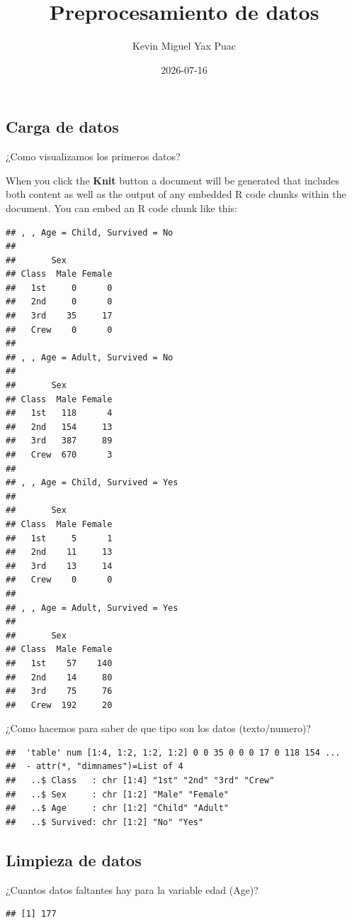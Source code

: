 \documentclass[
]{article}
\title{Preprocesamiento de datos}
\author{Kevin Miguel Yax Puac}
\date{2026-07-16}
\begin{document}
\maketitle

\subsection{Carga de datos}\label{carga-de-datos}

¿Como visualizamos los primeros datos?

When you click the \textbf{Knit} button a document will be generated
that includes both content as well as the output of any embedded R code
chunks within the document. You can embed an R code chunk like this:

\begin{verbatim}
## , , Age = Child, Survived = No
## 
##       Sex
## Class  Male Female
##   1st     0      0
##   2nd     0      0
##   3rd    35     17
##   Crew    0      0
## 
## , , Age = Adult, Survived = No
## 
##       Sex
## Class  Male Female
##   1st   118      4
##   2nd   154     13
##   3rd   387     89
##   Crew  670      3
## 
## , , Age = Child, Survived = Yes
## 
##       Sex
## Class  Male Female
##   1st     5      1
##   2nd    11     13
##   3rd    13     14
##   Crew    0      0
## 
## , , Age = Adult, Survived = Yes
## 
##       Sex
## Class  Male Female
##   1st    57    140
##   2nd    14     80
##   3rd    75     76
##   Crew  192     20
\end{verbatim}

¿Como hacemos para saber de que tipo son los datos (texto/numero)?

\begin{verbatim}
##  'table' num [1:4, 1:2, 1:2, 1:2] 0 0 35 0 0 0 17 0 118 154 ...
##  - attr(*, "dimnames")=List of 4
##   ..$ Class   : chr [1:4] "1st" "2nd" "3rd" "Crew"
##   ..$ Sex     : chr [1:2] "Male" "Female"
##   ..$ Age     : chr [1:2] "Child" "Adult"
##   ..$ Survived: chr [1:2] "No" "Yes"
\end{verbatim}

\subsection{Limpieza de datos}\label{limpieza-de-datos}

¿Cuantos datos faltantes hay para la variable edad (Age)?

\begin{verbatim}
## [1] 177
\end{verbatim}
\end{document}
